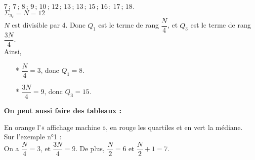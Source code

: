 \vspace*{.3cm}

$ 7 \, ; \,  7 \, ; \,  8 \, ; \,  9 \, ; \,  10 \, ; \,  12 \, ; \,  13 \, ; \,  13 \, ; \,  15 \, ; \,  16 \, ; \,  17 \, ; \,  18.$ \\

$\Sigma_{n_i} = N = 12$ \\

$N$ est divisible par 4. Donc $Q_1$ est le terme de rang $\dfrac{N}{4}$, et $Q_3$ est le terme de rang $\dfrac{3N}{4}$. \\

Ainsi,  \\

\begin{itemize}
\item[*] $\dfrac{N}{4} = 3$, donc $Q_1 = 8$.
\\
\item[*] $ \dfrac{3N}{4} = 9$, donc $Q_3 = 15$.
\end{itemize}

\newpage

\textbf{On peut aussi faire des tableaux :}


En orange l'« affichage machine », en rouge les quartiles et en vert la médiane. \\

Sur l'exemple n°1 : \\

On a $\dfrac{N}{4} = 3$, et $\dfrac{3N}{4} = 9$. De plus, $\dfrac{N}{2} = 6$ et $\dfrac{N}{2} + 1 = 7$.

